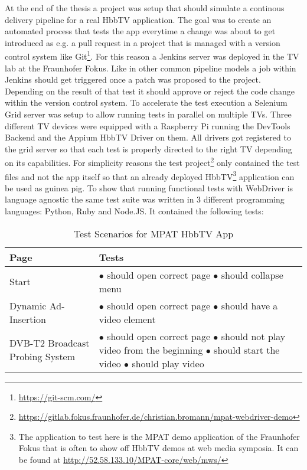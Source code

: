 At the end of the thesis a project was setup that should simulate a continous delivery pipeline for a real HbbTV application. The goal was to create an automated process that tests the app everytime a change was about to get introduced as e.g. a pull request in a project that is managed with a version control system like Git\footnote{\url{https://git-scm.com/}}. For this reason a Jenkins server was deployed in the TV lab at the Fraunhofer Fokus. Like in other common pipeline models a job within Jenkins should get triggered once a patch was proposed to the project. Depending on the result of that test it should approve or reject the code change within the version control system. To accelerate the test execution a Selenium Grid server was setup to allow running tests in parallel on multiple TVs. Three different TV devices were equipped with a Raspberry Pi running the DevTools Backend and the Appium HbbTV Driver on them. All drivers got registered to the grid server so that each test is properly directed to the right TV depending on its capabilities. For simplicity reasons the test project\footnote{\url{https://gitlab.fokus.fraunhofer.de/christian.bromann/mpat-webdriver-demo}} only contained the test files and not the app itself so that an already deployed HbbTV\footnote{The application to test here is the MPAT demo application of the Fraunhofer Fokus that is often to show off HbbTV demos at web media symposia. It can be found at \url{http://52.58.133.10/MPAT-core/web/mws/}} application can be used as guinea pig. To show that running functional tests with WebDriver is language agnostic the same test suite was written in 3 different programming languages: Python, Ruby and Node.JS. It contained the following tests:

\noindent
\begin{table}[h!]
    \centering
    \begin{tabular}{|p{}|p{}|}
        \hline
        \textbf{Page} & \textbf{Tests} \\
        \hline
        Start &
        $\bullet$ should open correct page \newline
        $\bullet$ should collapse menu \vspace*{0.1cm} \\
        \hline
        Dynamic Ad-Insertion &
        $\bullet$ should open correct page \newline
        $\bullet$ should have a video element \\
        \hline
        DVB-T2 Broadcast Probing System &
        $\bullet$ should open correct page \newline
        $\bullet$ should not play video from the beginning \newline
        $\bullet$ should start the video \newline
        $\bullet$ should play video \\
        \hline
    \end{tabular}
    \caption{Test Scenarios for MPAT HbbTV App}
    \label{tab:table1}
\end{table}

